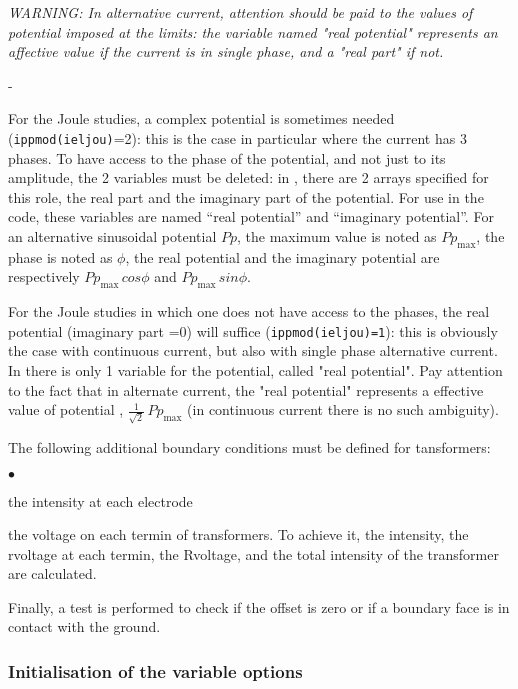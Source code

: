 {{ {\em WARNING: In alternative current, attention should be paid to the values of potential
 imposed at the limits: the variable named "real potential" represents an affective
 value if the current is in single phase, and a "real part" if not.}
\begin{list}{-}{}
\item For the Joule studies, a complex potential is sometimes needed
 (\texttt{ippmod(ieljou)}=2): this is the  case in particular where the current
 has 3 phases. To have access to the phase of the potential, and not just to its
 amplitude, the 2 variables must be deleted: in \CS, there are 2 arrays
 specified for this role, the real part and the imaginary
 part of the potential. For use in the code, these variables are named
 ``real potential'' and ``imaginary potential''. For an alternative
 sinusoidal potential $Pp$, the maximum value is noted as $Pp_\text{max}$,
 the phase is noted as $\phi$, the real potential
 and the imaginary potential are respectively $Pp_\text{max}\,cos\phi$ and
$Pp_\text{max}\,sin\phi$.
\item For the Joule studies in which one does not have access to the phases, the real
 potential (imaginary part =0) will suffice (\texttt{ippmod(ieljou)=1}): this is
 obviously the case with
 continuous current, but also with single phase alternative current. In \CS
there is only 1 variable for the potential,  called "real potential". Pay attention to
 the fact that in alternate current, the "real potential" represents a effective value
 of potential , $\frac{1}{\sqrt{2}}\,Pp_\text{max}$ (in continuous current there is no
 such ambiguity).
\end{list}


The following additional boundary conditions must be defined for tansformers:
\begin{list}{$\bullet$}{}
\item  the intensity at each electrode
\item  the voltage on each termin of transformers. To achieve it, the intensity,
 the rvoltage at each termin, the Rvoltage, and the total intensity of the
transformer are calculated.
\end{list}

Finally, a test is performed to check if the offset is zero or if a boundary
 face is in contact with the ground.

\subsubsection {Initialisation of the variable options}
\label{prg_useli1}%

}}
